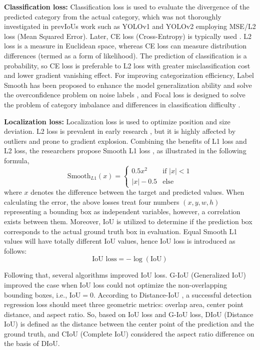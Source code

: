 \documentclass[lettersize,journal]{IEEEtran}
\begin{document}
\textbf{Classification loss: }
Classification loss is used to evaluate the divergence of the predicted category from the actual category, which was not thoroughly investigated in prevIoUs work such as YOLOv1 \cite{CVPR16-YOLO} and YOLOv2 \cite{CVPR17-YOLOv2} employing MSE/L2 loss (Mean Squared Error). Later, CE loss (Cross-Entropy) is typically used \cite{TPAMI17-FasterRCNN, redmon2018yolov3, ECCV16-SSD}. L2 loss is a measure in Euclidean space, whereas CE loss can measure distribution differences (termed as a form of likelihood). The prediction of classification is a probability, so CE loss is preferable to L2 loss with greater misclassification cost and lower gradient vanishing effect. For improving categorization efficiency, Label Smooth has been proposed to enhance the model generalization ability and solve the overconfidence problem on noise labels \cite{szegedy2016rethinking, muller2019does}, and Focal loss is designed to solve the problem of category imbalance and differences in classification difficulty \cite{ICCV17-Focal}.

\textbf{Localization loss: }
Localization loss is used to optimize position and size deviation. L2 loss is prevalent in early research \cite{CVPR16-YOLO, CVPR17-YOLOv2, CVPR14-RCNN}, but it is highly affected by outliers and prone to gradient explosion. Combining the benefits of L1 loss and L2 loss, the researchers propose Smooth L1 loss \cite{ICCV15-FastRCNN}, as illustrated in the following formula,
\begin{equation}
\text{Smooth}_{L1}(x) = 
\begin{cases}
0.5x^2 & \text{if } |x| < 1 \\
|x| - 0.5 & \text{else}
\end{cases}
\end{equation}
where $x$ denotes the difference between the target and predicted values. When calculating the error, the above losses treat four numbers $(x, y, w, h)$ representing a bounding box as independent variables, however, a correlation exists between them. Moreover, IoU is utilized to determine if the prediction box corresponds to the actual ground truth box in evaluation. Equal Smooth L1 values will have totally different IoU values, hence IoU loss \cite{ACMMM16-UnitBox} is introduced as follows:
\begin{equation}
\text{IoU loss} = - \log (\text{IoU})
\end{equation}

Following that, several algorithms improved IoU loss. G-IoU (Generalized IoU) \cite{rezatofighi2019generalized} improved the case when IoU loss could not optimize the non-overlapping bounding boxes, i.e., $\text{IoU}=0$. According to Distance-IoU \cite{zheng2020distance}, a successful detection regression loss should meet three geometric metrics: overlap area, center point distance, and aspect ratio. So, based on IoU loss and G-IoU loss, DIoU (Distance IoU) is defined as the distance between the center point of the prediction and the ground truth, and CIoU (Complete IoU) \cite{zheng2020distance} considered the aspect ratio difference on the basis of DIoU.
\end{document}
